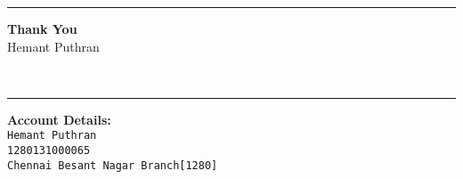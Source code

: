 \documentclass[]{invoice-style}
\begin{document}
\begin{minipage}[t][60em][c]{\textwidth}
\vfill
\hrule
	\begin{minipage}[][10em][b]{\textwidth}
	\begin{flushleft}
	{\large \bfseries Thank You}\vspace{.15cm}\\
	{\large  Hemant Puthran}
\end{flushleft}
	\end{minipage}\vspace*{1em}\\
\hrule
	\begin{minipage}[][7em][c]{\textwidth}
	\begin{flushleft}
{\large \bfseries Account Details:}\vspace{.15cm}\\
{\tt \large Hemant Puthran}\\
{\tt \large 1280131000065}\\
{\tt \large Chennai Besant Nagar Branch[1280]}\\


\end{flushleft}
	\end{minipage}

\end{minipage}
\end{document}
